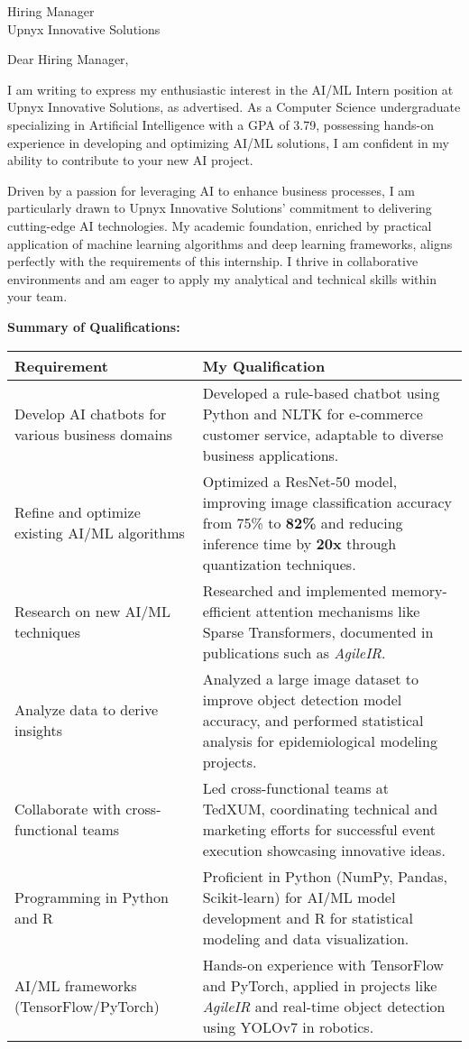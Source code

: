 \documentclass[10.5pt]{letter}
\date{\today}
\begin{document}
\begin{letter}{Hiring Manager\\Upnyx Innovative Solutions\\}

\opening{Dear Hiring Manager,}

I am writing to express my enthusiastic interest in the AI/ML Intern position at Upnyx Innovative Solutions, as advertised. As a Computer Science undergraduate specializing in Artificial Intelligence with a GPA of 3.79, possessing hands-on experience in developing and optimizing AI/ML solutions, I am confident in my ability to contribute to your new AI project.

Driven by a passion for leveraging AI to enhance business processes, I am particularly drawn to Upnyx Innovative Solutions' commitment to delivering cutting-edge AI technologies. My academic foundation, enriched by practical application of machine learning algorithms and deep learning frameworks, aligns perfectly with the requirements of this internship. I thrive in collaborative environments and am eager to apply my analytical and technical skills within your team.

\vspace{0.3cm}
\textbf{Summary of Qualifications:}
\vspace{0.2cm}

\renewcommand{\arraystretch}{1.4}
\begin{tabularx}{\textwidth}{@{}p{}X@{}}
\textbf{Requirement} & \textbf{My Qualification} \\
\hline
Develop AI chatbots for various business domains &  Developed a rule-based chatbot using Python and NLTK for e-commerce customer service, adaptable to diverse business applications. \\
Refine and optimize existing AI/ML algorithms &  Optimized a ResNet-50 model, improving image classification accuracy from 75\% to \textbf{82\%} and reducing inference time by \textbf{20x} through quantization techniques. \\
Research on new AI/ML techniques &  Researched and implemented memory-efficient attention mechanisms like Sparse Transformers, documented in publications such as \textit{AgileIR}. \\
Analyze data to derive insights & Analyzed a large image dataset to improve object detection model accuracy, and performed statistical analysis for epidemiological modeling projects. \\
Collaborate with cross-functional teams &  Led cross-functional teams at TedXUM, coordinating technical and marketing efforts for successful event execution showcasing innovative ideas. \\
Programming in Python and R & Proficient in Python (NumPy, Pandas, Scikit-learn) for AI/ML model development and R for statistical modeling and data visualization. \\
AI/ML frameworks (TensorFlow/PyTorch) & Hands-on experience with TensorFlow and PyTorch, applied in projects like \textit{AgileIR} and real-time object detection using YOLOv7 in robotics. \\
\end{tabularx}


\end{letter}
\end{document}
